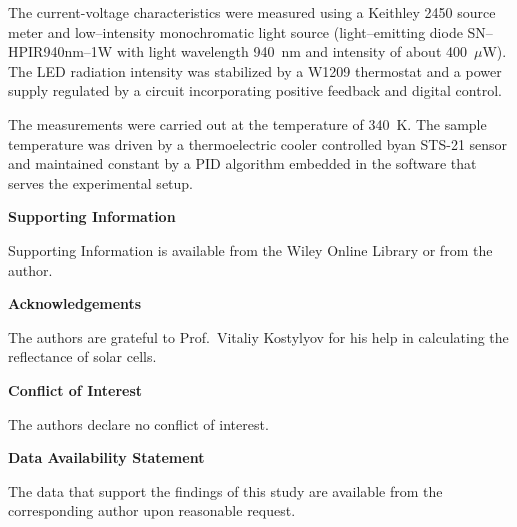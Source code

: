 \documentclass{WileyMSP-template}
\begin{document}
The current-voltage characteristics were measured using a Keithley 2450 source meter and
low--intensity monochromatic light source (light--emitting diode SN--HPIR940nm--1W with light wavelength 940~nm and intensity of about 400~$\mu$W).
The LED radiation intensity was stabilized by a W1209 thermostat and a power supply regulated by a circuit incorporating positive feedback and digital control.

The measurements were carried out at the temperature of 340~K.
The sample temperature was driven by a thermoelectric cooler
controlled byan STS-21 sensor
and maintained constant by a PID algorithm embedded in the software that serves the experimental setup.


\medskip
\textbf{Supporting Information} \par %
Supporting Information is available from the Wiley Online Library or from the author.



\medskip
\textbf{Acknowledgements} \par %
The authors are grateful to Prof.~Vitaliy Kostylyov for his help in calculating the reflectance of solar cells.

\medskip
\textbf{Conflict of Interest}\par
The authors declare no conflict of interest.

\medskip
\textbf{Data Availability Statement}\par
The data that support the findings of this study are available from the corresponding author upon reasonable request.
\medskip




\end{document}
